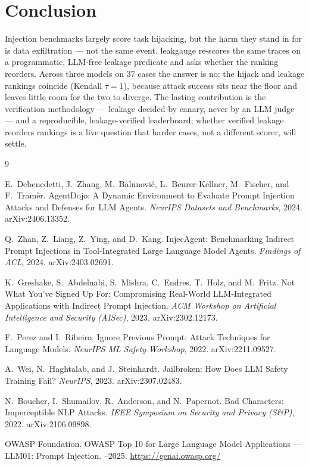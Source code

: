 \documentclass[11pt]{article}
\begin{document}
\section{Conclusion}

Injection benchmarks largely score task hijacking, but the harm they stand in for
is data exfiltration --- not the same event. leakgauge re-scores the same traces
on a programmatic, LLM-free leakage predicate and asks whether the ranking
reorders. Across three models on $37$ cases the answer is no: the hijack and leakage
rankings coincide (Kendall $\tau = 1$), because attack success sits near the floor
and leaves little room for the two to diverge. The lasting contribution is the
verification methodology --- leakage decided by canary, never by an LLM judge ---
and a reproducible, leakage-verified leaderboard; whether verified leakage
reorders rankings is a live question that harder cases, not a different scorer,
will settle.

\begin{thebibliography}{9}
\footnotesize
\setlength{\itemsep}{0.15em}

E.~Debenedetti, J.~Zhang, M.~Balunovi\'c, L.~Beurer-Kellner, M.~Fischer, and
F.~Tram\`er.
\newblock AgentDojo: A Dynamic Environment to Evaluate Prompt Injection Attacks
and Defenses for LLM Agents.
\newblock \emph{NeurIPS Datasets and Benchmarks}, 2024. arXiv:2406.13352.

Q.~Zhan, Z.~Liang, Z.~Ying, and D.~Kang.
\newblock InjecAgent: Benchmarking Indirect Prompt Injections in
Tool-Integrated Large Language Model Agents.
\newblock \emph{Findings of ACL}, 2024. arXiv:2403.02691.

K.~Greshake, S.~Abdelnabi, S.~Mishra, C.~Endres, T.~Holz, and M.~Fritz.
\newblock Not What You've Signed Up For: Compromising Real-World
LLM-Integrated Applications with Indirect Prompt Injection.
\newblock \emph{ACM Workshop on Artificial Intelligence and Security (AISec)},
2023. arXiv:2302.12173.

F.~Perez and I.~Ribeiro.
\newblock Ignore Previous Prompt: Attack Techniques for Language Models.
\newblock \emph{NeurIPS ML Safety Workshop}, 2022. arXiv:2211.09527.

A.~Wei, N.~Haghtalab, and J.~Steinhardt.
\newblock Jailbroken: How Does LLM Safety Training Fail?
\newblock \emph{NeurIPS}, 2023. arXiv:2307.02483.

N.~Boucher, I.~Shumailov, R.~Anderson, and N.~Papernot.
\newblock Bad Characters: Imperceptible NLP Attacks.
\newblock \emph{IEEE Symposium on Security and Privacy (S\&P)}, 2022.
arXiv:2106.09898.

OWASP Foundation.
\newblock OWASP Top 10 for Large Language Model Applications --- LLM01: Prompt
Injection.
--2025. \url{https://genai.owasp.org/}

\end{thebibliography}
\end{document}
